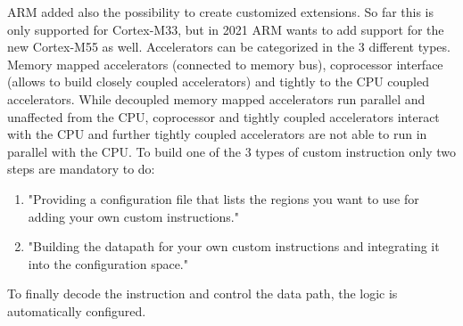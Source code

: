 \documentclass[conference]{IEEEtran}
\begin{document}
	ARM added also the possibility to create customized extensions. So far this is only supported for Cortex-M33, but in 2021 ARM wants to add support for the new Cortex-M55 as well. Accelerators can be categorized in the 3 different types. Memory mapped accelerators (connected to memory bus), coprocessor interface (allows to build closely coupled accelerators) and tightly to the CPU coupled accelerators. 
	While decoupled memory mapped accelerators run parallel and unaffected from the CPU, coprocessor and tightly coupled accelerators interact with the CPU and further tightly coupled accelerators are not able to run in parallel with the CPU. To build one of the 3 types of custom instruction only two steps are mandatory to do: 
	\begin{enumerate}
	\item "Providing a configuration file that lists the regions you want to use for adding your own custom instructions." \cite[page 4]{LauranneChoquin2020}
	\item "Building the datapath for your own custom instructions and integrating
	it into the configuration space." \cite[page 4]{LauranneChoquin2020}
	\end{enumerate}
	To finally decode the instruction and control the data path, the logic is automatically configured. \cite[page 2ff]{LauranneChoquin2020}
\end{document}
